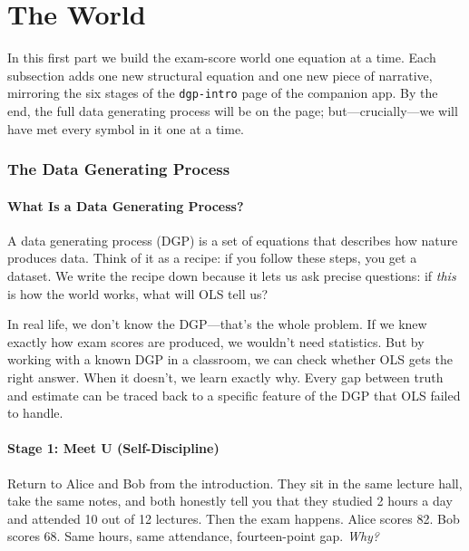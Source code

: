 \documentclass[11pt,a4paper]{article}
\theoremstyle{definition}
\theoremstyle{plain}
\theoremstyle{remark}
\begin{document}
\part{The World}\label{part:world}

In this first part we build the exam-score world one equation at a time. Each subsection adds one new structural equation and one new piece of narrative, mirroring the six stages of the \texttt{dgp-intro} page of the companion app. By the end, the full data generating process will be on the page; but---crucially---we will have met every symbol in it one at a time.

\section{The Data Generating Process}\label{sec:dgp}

\subsection{What Is a Data Generating Process?}\label{subsec:what-dgp}

A data generating process (DGP) is a set of equations that describes how nature produces data. Think of it as a recipe: if you follow these steps, you get a dataset. We write the recipe down because it lets us ask precise questions: if \emph{this} is how the world works, what will OLS tell us?

In real life, we don't know the DGP---that's the whole problem. If we knew exactly how exam scores are produced, we wouldn't need statistics. But by working with a known DGP in a classroom, we can check whether OLS gets the right answer. When it doesn't, we learn exactly why. Every gap between truth and estimate can be traced back to a specific feature of the DGP that OLS failed to handle.

\subsection{Stage 1: Meet U (Self-Discipline)}\label{subsec:stage-U}

Return to Alice and Bob from the introduction. They sit in the same lecture hall, take the same notes, and both honestly tell you that they studied 2 hours a day and attended 10 out of 12 lectures. Then the exam happens. Alice scores 82. Bob scores 68. Same hours, same attendance, fourteen-point gap. \emph{Why?}
\end{document}
